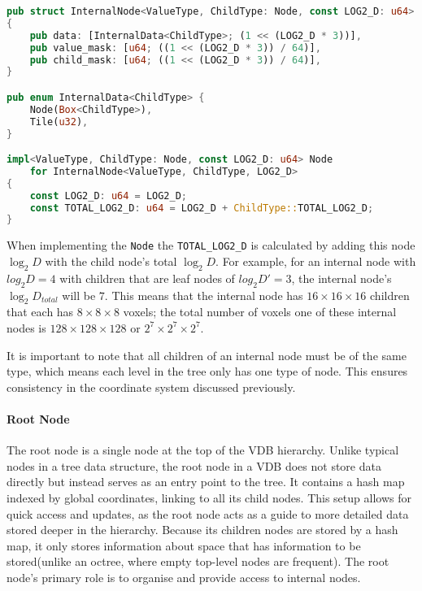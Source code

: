 \begin{lstlisting}[language=rust, captionpos=b, caption={
    \texttt{InternalNode} definition. Internal nodes have an extra field, the child mask, which is the same size as the value mask.
    Additionally, the internal data enum now has variants for a child pointer or 4 bytes of memory.
}]
pub struct InternalNode<ValueType, ChildType: Node, const LOG2_D: u64>
{
    pub data: [InternalData<ChildType>; (1 << (LOG2_D * 3))],
    pub value_mask: [u64; ((1 << (LOG2_D * 3)) / 64)],
    pub child_mask: [u64; ((1 << (LOG2_D * 3)) / 64)],
}

pub enum InternalData<ChildType> {
    Node(Box<ChildType>),
    Tile(u32),
}

impl<ValueType, ChildType: Node, const LOG2_D: u64> Node
    for InternalNode<ValueType, ChildType, LOG2_D>
{
    const LOG2_D: u64 = LOG2_D;
    const TOTAL_LOG2_D: u64 = LOG2_D + ChildType::TOTAL_LOG2_D;
}
\end{lstlisting}

When implementing the \verb|Node| the \verb|TOTAL_LOG2_D| is calculated by adding this node $\log_{2}D$ with the child node's total $\log_{2}D$.
For example, for an internal node with $log_{2}D = 4$ with children that are leaf nodes of $log_{2}D' = 3$, the internal node's $\log_{2}D_{{total}}$ will be $7$. This means that the internal node has $16\times16\times16$  children that each has $8\times8\times8$ voxels; the total number of voxels one of these internal nodes is $128\times128\times128$ or $2^{7}\times2^{7}\times2^{7}$.

It is important to note that all children of an internal node must be of the same type, which means each level in the tree only has one type of node. This ensures consistency in the coordinate system discussed previously.

\paragraph{Root Node} The root node is a single node at the top of the VDB hierarchy. Unlike typical nodes in a tree data structure, the root node in a VDB does not store data directly but instead serves as an entry point to the tree.
It contains a hash map indexed by global coordinates, linking to all its child nodes. This setup allows for quick access and updates, as the root node acts as a guide to more detailed data stored deeper in the hierarchy. Because its children nodes are stored by a hash map, it only stores information about space that has information to be stored(unlike an octree, where empty top-level nodes are frequent). The root node's primary role is to organise and provide access to internal nodes.


